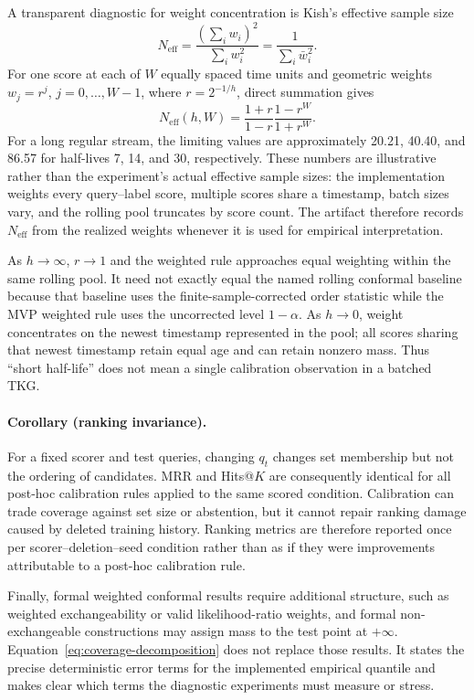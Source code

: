 A transparent diagnostic for weight concentration is Kish's effective sample
size
\[
  N_{\mathrm{eff}}
  =\frac{(\sum_i w_i)^2}{\sum_i w_i^2}
  =\frac{1}{\sum_i\bar w_i^2}.
\]
For one score at each of \(W\) equally spaced time units and geometric weights
\(w_j=r^j\), \(j=0,\ldots,W-1\), where \(r=2^{-1/h}\), direct summation gives
\[
  N_{\mathrm{eff}}(h,W)
  =\frac{1+r}{1-r}\frac{1-r^W}{1+r^W}.
  \tag{2}\label{eq:neff-geometric}
\]
For a long regular stream, the limiting values are approximately 20.21, 40.40,
and 86.57 for half-lives 7, 14, and 30, respectively.  These numbers are
illustrative rather than the experiment's actual effective sample sizes: the
implementation weights every query--label score, multiple scores share a
timestamp, batch sizes vary, and the rolling pool truncates by score count.
The artifact therefore records \(N_{\mathrm{eff}}\) from the realized weights
whenever it is used for empirical interpretation.

As \(h\rightarrow\infty\), \(r\rightarrow1\) and the weighted rule approaches
equal weighting within the same rolling pool.  It need not exactly equal the
named rolling conformal baseline because that baseline uses the
finite-sample-corrected order statistic while the MVP weighted rule uses the
uncorrected level \(1-\alpha\).  As \(h\rightarrow0\), weight concentrates on
the newest timestamp represented in the pool; all scores sharing that newest
timestamp retain equal age and can retain nonzero mass.  Thus ``short
half-life'' does not mean a single calibration observation in a batched TKG.

\paragraph{Corollary (ranking invariance).}
For a fixed scorer and test queries, changing \(q_t\) changes set membership but
not the ordering of candidates.  MRR and Hits@\(K\) are consequently identical
for all post-hoc calibration rules applied to the same scored condition.
Calibration can trade coverage against set size or abstention, but it cannot
repair ranking damage caused by deleted training history.  Ranking metrics are
therefore reported once per scorer--deletion--seed condition rather than as if
they were improvements attributable to a post-hoc calibration rule.

Finally, formal weighted conformal results require additional structure, such
as weighted exchangeability or valid likelihood-ratio weights, and formal
non-exchangeable constructions may assign mass to the test point at
\(+\infty\).  Equation~\eqref{eq:coverage-decomposition} does not replace
those results.  It states the precise deterministic error terms for the
implemented empirical quantile and makes clear which terms the diagnostic
experiments must measure or stress.
